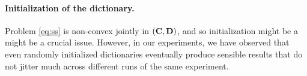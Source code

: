 

\paragraph{Initialization of the dictionary.}
Problem \eqref{eq:ss} is non-convex jointly in  $(\mathbf{C}, \mathbf{D})$, and so initialization might be a might be a crucial issue. However, in our experiments, we have observed that even randomly initialized dictionaries eventually produce sensible results that do not jitter much across different runs of the same experiment. %

